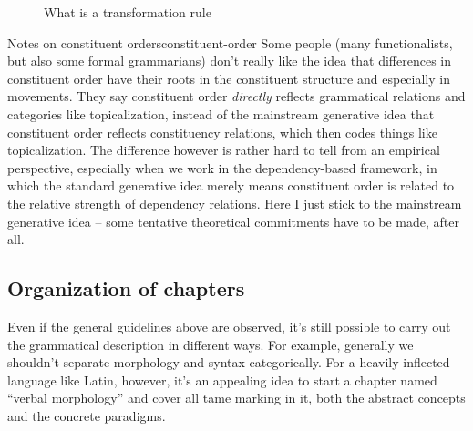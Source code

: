 \documentclass[a4paper, oneside]{report}
\begin{document}
\begin{figure}[H]
    \caption{What is a transformation rule}
    \label{fig:transformation-rule}        
\end{figure}

\begin{theorybox}{Notes on constituent orders}{constituent-order}
    Some people (many functionalists, but also some formal grammarians) 
    don't really like the idea that 
    differences in constituent order have their roots in 
    the constituent structure and especially in movements. 
    They say constituent order \emph{directly} reflects 
    grammatical relations and categories like topicalization, 
    instead of the mainstream generative idea that 
    constituent order reflects constituency relations,
    which then codes things like topicalization. 
    The difference however is rather hard to tell 
    from an empirical perspective, 
    especially when we work in the dependency-based framework,
    in which the standard generative idea merely means 
    constituent order is related to the relative strength of dependency relations.
    Here I just stick to the mainstream generative idea -- 
    some tentative theoretical commitments have to be made, 
    after all.
\end{theorybox}

\subsection{Organization of chapters}

Even if the general guidelines above are observed, 
it's still possible to carry out the grammatical description in different ways.  
For example, generally we shouldn't separate morphology and syntax categorically.
For a heavily inflected language like Latin, however, 
it's an appealing idea 
to start a chapter named ``verbal morphology''
and cover all \acs{tame} marking in it, 
both the abstract concepts and the concrete paradigms. 
\end{document}
